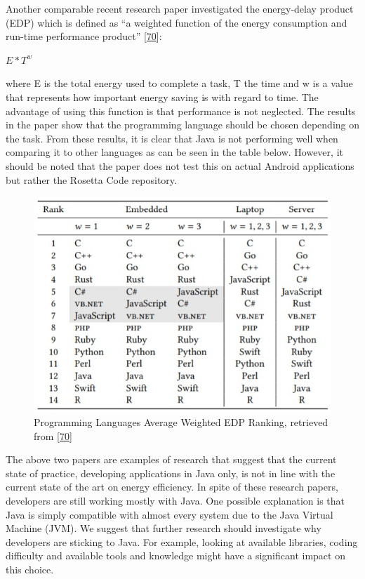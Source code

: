 \documentclass[]{book}
\begin{document}
Another comparable recent research paper investigated the energy-delay
product (EDP) which is defined as ``a weighted function of the energy
consumption and run-time performance product''
{[}\protect\hyperlink{ref-GKLS2018}{70}{]}:

\(E * T^w\)

where E is the total energy used to complete a task, T the time and w is
a value that represents how important energy saving is with regard to
time. The advantage of using this function is that performance is not
neglected. The results in the paper show that the programming language
should be chosen depending on the task. From these results, it is clear
that Java is not performing well when comparing it to other languages as
can be seen in the table below. However, it should be noted that the
paper does not test this on actual Android applications but rather the
Rosetta Code repository.

\begin{figure}
\centering
\includegraphics{figures/EDPranking.jpeg}
\caption{Programming Languages Average Weighted EDP Ranking, retrieved
from {[}\protect\hyperlink{ref-GKLS2018}{70}{]}}
\end{figure}

The above two papers are examples of research that suggest that the
current state of practice, developing applications in Java only, is not
in line with the current state of the art on energy efficiency. In spite
of these research papers, developers are still working mostly with Java.
One possible explanation is that Java is simply compatible with almost
every system due to the Java Virtual Machine (JVM). We suggest that
further research should investigate why developers are sticking to Java.
For example, looking at available libraries, coding difficulty and
available tools and knowledge might have a significant impact on this
choice.
\end{document}
